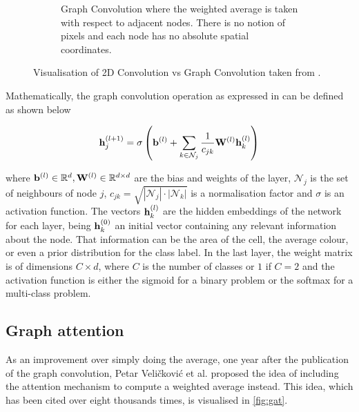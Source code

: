 \begin{figure}[ht]
\begin{subfigure}[b]{0.4\textwidth}
        \caption{Graph Convolution where the weighted average is taken with respect to adjacent nodes. There is no notion of pixels and each node has no absolute spatial coordinates.}
    \end{subfigure}
    \caption{Visualisation of 2D Convolution vs Graph Convolution taken from \cite{graph_survey}.}
    \label{fig:conv_comp}
\end{figure}

Mathematically, the graph convolution operation as expressed in \cite{graphconv} can be defined as shown below

\begin{equation}
    {\mathbf h}_j^{(l+1)} = \sigma \left({\mathbf b}^{(l)} + \sum_{k \in \mathcal{N}_j} \frac{1}{c_{jk}} {\mathbf W}^{(l)}{\mathbf h}_k^{(l)}\right)
\end{equation}

\noindent where ${\mathbf b}^{(l)}\in \mathbb{R}^d, {\mathbf W}^{(l)} \in \mathbb{R}^{d\times d}$ are the bias and weights of the layer, $\mathcal{N}_j$ is the set of neighbours of node $j$, $c_{jk} = \sqrt{|\mathcal{N}_j|\cdot |\mathcal{N}_k|}$ is a normalisation factor and $\sigma$ is an activation function. The vectors ${\mathbf h}_k^{(l)}$ are the hidden embeddings of the network for each layer, being ${\mathbf h}_k^{(0)}$ an initial vector containing any relevant information about the node. That information can be the area of the cell, the average colour, or even a prior distribution for the class label. In the last layer, the weight matrix is of dimensions $C \times d$, where $C$ is the number of classes or $1$ if $C=2$ and the activation function is either the sigmoid for a binary problem or the softmax \cite{softmax} for a multi-class problem.

\subsection{Graph attention}

As an improvement over simply doing the average, one year after the publication of the graph convolution, Petar Veličković et al. \cite{graphatt} proposed the idea of including the attention mechanism \cite{attention} to compute a weighted average instead. This idea, which has been cited over eight thousands times, is visualised in \autoref{fig:gat}.

